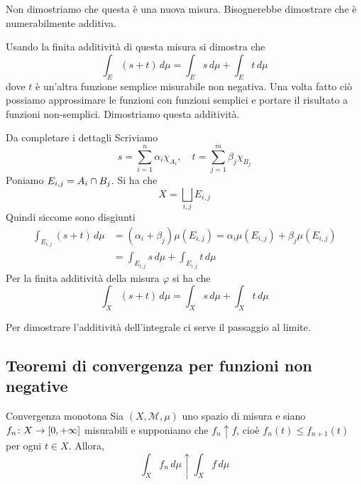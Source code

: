 \documentclass[a4paper]{article}
\begin{document}
\begin{radioactive}
Non dimostriamo che questa è una nuova misura. Bisognerebbe dimostrare che è numerabilmente additiva.
\end{radioactive}

\begin{radioactive}
Usando la finita additività di questa misura si dimostra che
\[
    \int_E (s+t)\,d\mu = \int_E s\,d\mu
    + \int_E t\,d\mu
\]
dove \(t\) è un'altra funzione semplice misurabile non negativa.
Una volta fatto ciò possiamo approssimare le funzioni con funzioni semplici
e portare il risultato a funzioni non-semplici.
Dimostriamo questa additività.
\end{radioactive}

\begin{radioactive}
\begin{snippetproof}{Da completare i dettagli}
    Scriviamo
    \[
        s=\sum_{i=1}^n \alpha_i \chi_{A_i}, \quad
        t=\sum_{j=1}^m\beta_j\chi_{B_j}
    \]
    Poniamo \(E_{i,j} = A_i \cap B_j\).
    Si ha che
    \[
        X = \bigsqcup_{i,j} E_{i,j}
    \]
    Quindi siccome sono disgiunti
    \begin{align*}
        \int_{E_{i,j}}(s+t)\,d\mu
        &= (\alpha_i + \beta_j)\mu(E_{i,j})
        =\alpha_i \mu(E_{i,j}) + \beta_j\mu(E_{i,j}) \\
        &= \int_{E_{i,j}} s\,d\mu + \int_{E_{i,j}} t\,d\mu
    \end{align*}
    Per la finita additività della misura \(\varphi\) si ha che
    \[
        \int_X (s+t)\,d\mu
        =\int_X s\,d\mu + \int_X t\,d\mu
    \]
\end{snippetproof}
\end{radioactive}

\begin{radioactive}
Per dimostrare l'additività dell'integrale
ci serve il passaggio al limite.
\end{radioactive}

\subsection{Teoremi di convergenza per funzioni non negative}

\begin{radioactive}
\begin{snippettheorem}{Convergenza monotona}
    Sia \((X, \mathcal M, \mu)\)
    uno spazio di misura e siano \(f_n \colon X \to [0, +\infty]\)
    misurabili e supponiamo che \(f_n \uparrow f\), cioè \(f_n(t) \leq f_{n+1}(t)\)
    per ogni \(t \in X\). Allora, \[
        \int_X f_n\,d\mu \uparrow \int_X f\,d\mu
    \]
\end{snippettheorem}
\end{radioactive}
\end{document}
